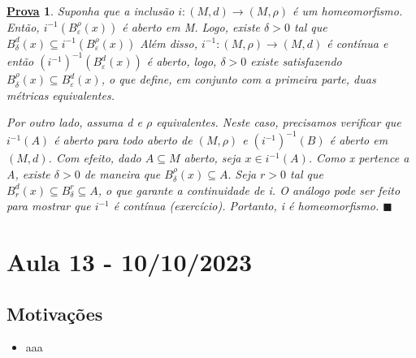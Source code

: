 \documentclass{article}
\newtheorem*{proof*}{\underline{Prova}}
\renewcommand\qedsymbol{$\blacksquare$}
\begin{document}
\begin{proof*}
  Suponha que a inclusão \(i:(M, d)\rightarrow (M, \rho )\) é um homeomorfismo. Então, 
\(i^{-1}(B_{\varepsilon }^{\rho }(x))\) é aberto em M. Logo, existe \(\delta > 0\) tal que 
\(B_{\delta }^{d}(x) \subseteq{i^{-1}(B_{\varepsilon }^{\rho }(x))}\)
Além disso, \(i^{-1}:(M, \rho )\rightarrow (M, d)\) é contínua e então \((i^{-1})^{-1}(B_{\varepsilon }^{d}(x))\)
é aberto, logo, \(\delta >0\) existe satisfazendo \(B_{\delta }^{\rho }(x) \subseteq{B_{\varepsilon }^{d}(x)}\), o 
que define, em conjunto com a primeira parte, duas métricas equivalentes.

  Por outro lado, assuma d e \(\rho \) equivalentes. Neste caso, precisamos verificar
que \(i^{-1}(A)\) é aberto para todo aberto de \((M, \rho) \) e \((i^{-1})^{-1}(B)\) é aberto em \((M, d)\).
Com efeito, dado \(A\subseteq{M}\) aberto, seja \(x\in i^{-1}(A)\). Como x pertence a A, existe \(\delta >0\) de
maneira que \(B_{\delta }^{\rho }(x)\subseteq{A}.\) Seja \(r > 0\) tal que \(B_{r}^{d}(x)\subseteq{B_{\delta }^{r}}\subseteq{A}\),
o que garante a continuidade de i. O análogo pode ser feito para mostrar que \(i^{-1}\) é contínua (exercício).
Portanto, i é homeomorfismo. \qedsymbol
\end{proof*}
\newpage

\section{Aula 13 - 10/10/2023}
\subsection{Motivações}
\begin{itemize}
  \item aaa
\end{itemize}
\end{document}
